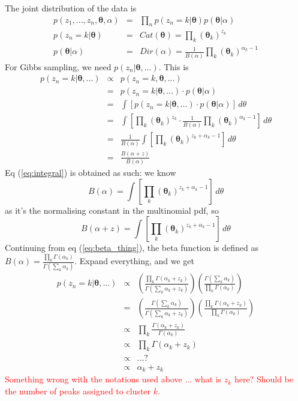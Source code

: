 \documentclass[12pt,a4paper]{article}
\newcommand\todo[1]{\textcolor{red}{#1}}
\begin{document}
The joint distribution of the data is 
\begin{eqnarray}
p(z_{1},...,z_{n},\boldsymbol{\theta},\alpha) & = & \prod_{n}p(z_{n}=k|\boldsymbol{\theta})p(\boldsymbol{\theta}|\alpha)\\
p(z_{n}=k|\boldsymbol{\theta}) & = & Cat(\boldsymbol{\theta})=\prod_{k}(\boldsymbol{\theta}_{k})^{z_{k}}\\
p(\boldsymbol{\theta}|\alpha) & = & Dir(\alpha)=\frac{1}{B(\alpha)}\prod_{k}(\boldsymbol{\theta}_{k})^{\alpha_{k}-1}
\end{eqnarray}
For Gibbs sampling, we need $p(z_{n}|\boldsymbol{\theta},...)$. This
is
\begin{eqnarray}
p(z_{n}=k|\boldsymbol{\theta},...) & \propto & p(z_{n}=k,\boldsymbol{\theta},...)\\
 & = & p(z_{n}=k|\boldsymbol{\theta},...)\cdot p(\boldsymbol{\theta}|\alpha)\\
 & = & \int\left[p(z_{n}=k|\boldsymbol{\theta},...)\cdot p(\boldsymbol{\theta}|\alpha)\right]\, d\theta\\
 & = & \int\left[\prod_{k}(\boldsymbol{\theta}_{k})^{z_{k}}\cdot\frac{1}{B(\alpha)}\prod_{k}(\boldsymbol{\theta}_{k})^{\alpha_{k}-1}\right]\, d\theta\\
 & = & \frac{1}{B(\alpha)}\int\left[\prod_{k}(\boldsymbol{\theta}_{k})^{z_{k}+\alpha_{k}-1}\right]\, d\theta\label{eq:integral}\\
 & = & \frac{B(\alpha+z)}{B(\alpha)}\label{eq:beta_thing}
\end{eqnarray}
Eq (\ref{eq:integral}) is obtained as such: we know 
\begin{equation}
B(\alpha)=\int\left[\prod_{k}(\boldsymbol{\theta}_{k})^{z_{k}+\alpha_{k}-1}\right]\, d\theta
\end{equation}
as it's the normalising constant in the multinomial pdf, so 
\begin{equation}
B(\alpha+z)=\int\left[\prod_{k}(\boldsymbol{\theta}_{k})^{z_{k}+\alpha_{k}-1}\right]\, d\theta
\end{equation}
Continuing from eq (\ref{eq:beta_thing}), the beta function is defined
as $B(\alpha)=\frac{\prod_{k}\Gamma(\alpha_{k})}{\Gamma(\sum_{k}\alpha_{k})}$.
Expand everything, and we get
\begin{eqnarray}
p(z_{n}=k|\boldsymbol{\theta},...) & \propto & \left(\frac{\prod_{k}\Gamma(\alpha_{k}+z_{k})}{\Gamma(\sum_{k}\alpha_{k}+z_{k})}\right)\left(\frac{\Gamma(\sum_{k}\alpha_{k})}{\prod_{k}\Gamma(\alpha_{k})}\right)\\
 & = & \left(\frac{\Gamma(\sum_{k}\alpha_{k})}{\Gamma(\sum_{k}\alpha_{k}+z_{k})}\right)\left(\frac{\prod_{k}\Gamma(\alpha_{k}+z_{k})}{\prod_{k}\Gamma(\alpha_{k})}\right)\\
 & \propto & \prod_{k}\frac{\Gamma(\alpha_{k}+z_{k})}{\Gamma(\alpha_{k})}\\
 & \propto & \prod_{k}\Gamma(\alpha_{k}+z_{k})\\
 & \propto & ...?\\
 & \propto & \alpha_{k}+z_{k}
\end{eqnarray}
\todo{Something wrong with the notations used above ... what is $z_{k}$ here? Should be the number of peaks assigned to cluster $k$.}

\nocite{*}


\end{document}
